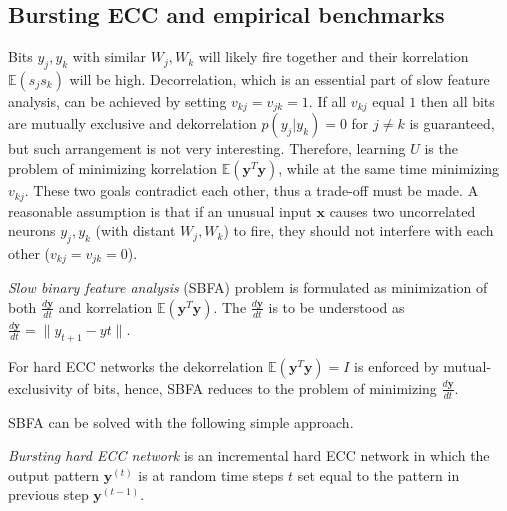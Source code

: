 \documentclass[oneside,english,logo]{amuthesis}
\begin{document}
\subsection{Bursting ECC and empirical benchmarks}
Bits $y_j,y_k$ with similar $W_j,W_k$ will likely fire together and their korrelation $\mathbb{E}(s_j s_k)$ will be high. Decorrelation, which is an essential part of slow feature analysis, can be achieved by setting $v_{kj}=v_{jk}=1$. If all $v_{kj}$ equal $1$ then all bits are mutually exclusive and dekorrelation $p(y_j|y_k) = 0$ for $j\ne k$ is guaranteed, but such arrangement is not very interesting. Therefore, learning $U$ is the problem of minimizing korrelation $\mathbb{E}(\boldsymbol{y}^T \boldsymbol{y})$, while at the same time minimizing $v_{kj}$. These two goals contradict each other, thus a trade-off  must be made. A reasonable assumption is that if an unusual input $\boldsymbol{x}$ causes two uncorrelated neurons $y_j,y_k$ (with distant $W_j,W_k$) to fire, they should not interfere with each other ($v_{kj}=v_{jk}=0$). 
\begin{definition}
	\textit{Slow binary feature analysis} (SBFA) problem is formulated as minimization of both $\frac{d\boldsymbol{y}}{dt}$ and korrelation $\mathbb{E}(\boldsymbol{y}^T \boldsymbol{y})$.  The $\frac{d\boldsymbol{y}}{dt}$ is to be understood as $\frac{d\boldsymbol{y}}{dt}=\lVert y_{t+1}-y{t} \rVert$.
\end{definition}
\begin{corollary}
For hard ECC networks the dekorrelation $\mathbb{E}(\boldsymbol{y}^T \boldsymbol{y})=I$ is enforced by mutual-exclusivity of bits, hence, SBFA reduces to the problem of minimizing $\frac{d\boldsymbol{y}}{dt}$. 
\end{corollary}
SBFA can be solved with the following simple approach.
\begin{definition}
	\textit{Bursting hard ECC network} is an incremental hard ECC network in which the output pattern $\boldsymbol{y}^{(t)}$ is at random time steps $t$ set equal to the pattern in previous step $\boldsymbol{y}^{(t-1)}$. 
\end{definition}
\end{document}

